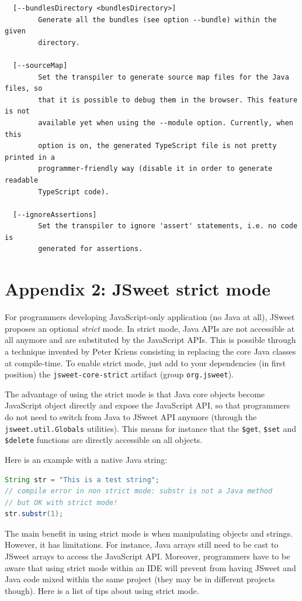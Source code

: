 \documentclass[a4paper]{report}
\begin{document}
\begin{verbatim}
  [--bundlesDirectory <bundlesDirectory>]
        Generate all the bundles (see option --bundle) within the given
        directory.

  [--sourceMap]
        Set the transpiler to generate source map files for the Java files, so
        that it is possible to debug them in the browser. This feature is not
        available yet when using the --module option. Currently, when this
        option is on, the generated TypeScript file is not pretty printed in a
        programmer-friendly way (disable it in order to generate readable
        TypeScript code).

  [--ignoreAssertions]
        Set the transpiler to ignore 'assert' statements, i.e. no code is
        generated for assertions.
\end{verbatim}

\chapter*{Appendix 2: JSweet strict mode}

For programmers developing JavaScript-only application (no Java at all), JSweet proposes an optional \emph{strict} mode. In strict mode, Java APIs are not accessible at all anymore and are substituted by the JavaScript APIs. This is possible through a technique invented by Peter Kriens consisting in replacing the core Java classes at compile-time. To enable strict mode, just add to your dependencies (in first position) the \texttt{jsweet-core-strict} artifact (group \texttt{org.jsweet}).

The advantage of using the strict mode is that Java core objects become JavaScript object directly and expose the JavaScript API, so that programmers do not need to switch from Java to JSweet API anymore (through the \texttt{jsweet.util.Globals} utilities). This means for instance that the \texttt{\$get}, \texttt{\$set} and \texttt{\$delete} functions are directly accessible on all objects.

Here is an example with a native Java string:

\begin{lstlisting}[language=Java]
String str = "This is a test string";
// compile error in non strict mode: substr is not a Java method
// but OK with strict mode! 
str.substr(1); 
\end{lstlisting}

The main benefit in using strict mode is when manipulating objects and strings. However, it has limitations. For instance, Java arrays still need to be cast to JSweet arrays to access the JavaScript API. Moreover, programmers have to be aware that using strict mode within an IDE will prevent from having JSweet and Java code mixed within the same project (they may be in different projects though). Here is a list of tips about using strict mode.
\end{document}
